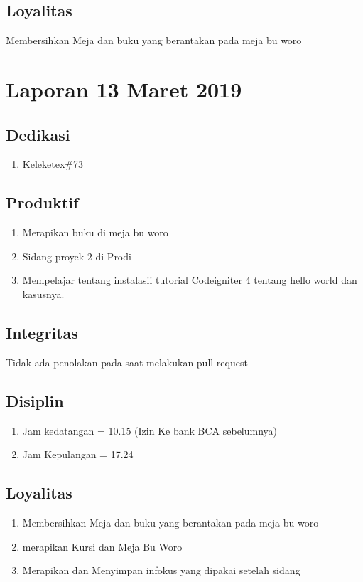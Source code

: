 \subsection{Loyalitas}
 Membersihkan Meja dan buku yang berantakan pada meja bu woro


\section{Laporan 13 Maret 2019}
\subsection{Dedikasi}
\begin{enumerate}
\item Keleketex\#73
\end{enumerate}
\subsection{Produktif}
\begin{enumerate}
\item Merapikan buku di meja bu woro
\item Sidang proyek 2 di Prodi
\item Mempelajar tentang instalasii tutorial Codeigniter 4 tentang hello world dan kasusnya.
\end{enumerate}
\subsection{Integritas}
Tidak ada penolakan pada saat melakukan pull request
\subsection{Disiplin}
\begin{enumerate}
\item Jam kedatangan =  10.15 (Izin Ke bank BCA sebelumnya)
\item Jam Kepulangan = 17.24
\end{enumerate}
\subsection{Loyalitas}
\begin{enumerate}
\item Membersihkan Meja dan buku yang berantakan pada meja bu woro
\item merapikan Kursi dan Meja Bu Woro
\item Merapikan dan Menyimpan infokus yang dipakai setelah sidang
\end{enumerate}



